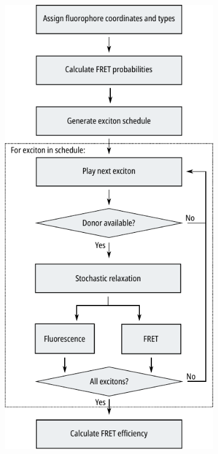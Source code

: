 \begin{figure}[hbtp]
	\centering
	\begin{minipage}{0.35\textwidth}
	\begin{subfigure}[t]{\textwidth}
		\caption{}\label{ch3fig:exifret_program}
		\centering
		\includegraphics[width=\textwidth]{exifret_program.pdf}

\end{subfigure}
\end{minipage}
\end{figure}
